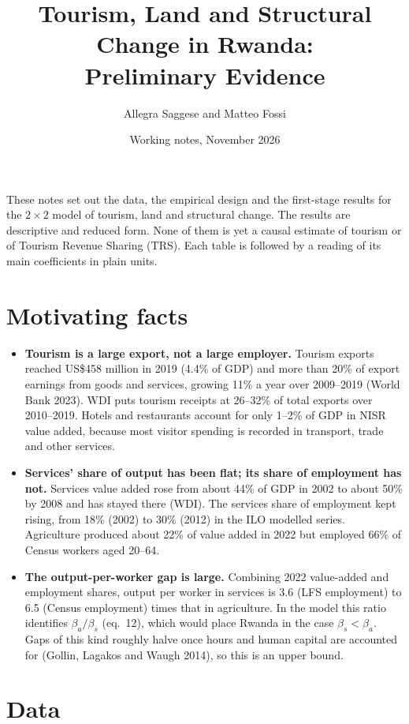 \documentclass[11pt]{article}
\title{Tourism, Land and Structural Change in Rwanda:\\ Preliminary Evidence}
\author{Allegra Saggese and Matteo Fossi}
\date{Working notes, November 2026}
\begin{document}
\maketitle

\noindent These notes set out the data, the empirical design and the first-stage results for the $2\times2$ model of tourism, land and structural change. The results are descriptive and reduced form. None of them is yet a causal estimate of tourism or of Tourism Revenue Sharing (TRS). Each table is followed by a reading of its main coefficients in plain units.

\section{Motivating facts}

\begin{itemize}
\item \textbf{Tourism is a large export, not a large employer.} Tourism exports reached US\$458 million in 2019 (4.4\% of GDP) and more than 20\% of export earnings from goods and services, growing 11\% a year over 2009--2019 (World Bank 2023). WDI puts tourism receipts at 26--32\% of total exports over 2010--2019. Hotels and restaurants account for only 1--2\% of GDP in NISR value added, because most visitor spending is recorded in transport, trade and other services.
\item \textbf{Services' share of output has been flat; its share of employment has not.} Services value added rose from about 44\% of GDP in 2002 to about 50\% by 2008 and has stayed there (WDI). The services share of employment kept rising, from 18\% (2002) to 30\% (2012) in the ILO modelled series. Agriculture produced about 22\% of value added in 2022 but employed 66\% of Census workers aged 20--64.
\item \textbf{The output-per-worker gap is large.} Combining 2022 value-added and employment shares, output per worker in services is 3.6 (LFS employment) to 6.5 (Census employment) times that in agriculture. In the model this ratio identifies $\beta_a/\beta_s$ (eq.\ 12), which would place Rwanda in the case $\beta_s<\beta_a$. Gaps of this kind roughly halve once hours and human capital are accounted for (Gollin, Lagakos and Waugh 2014), so this is an upper bound.
\end{itemize}

\section{Data}
\end{document}
